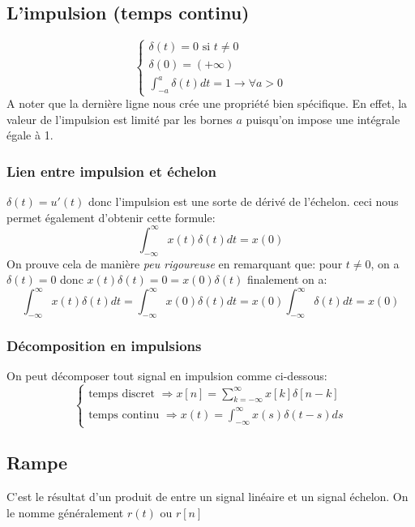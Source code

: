 \documentclass{report}
\begin{document}
\subsection{L'impulsion (temps continu)}
\begin{equation}
\begin{cases}
\delta (t) = 0 \text{ si } t \neq 0\\
\delta (0) = (+\infty)\\
\int_{-a}^a \delta (t) dt = 1 \rightarrow \forall a > 0
\end{cases}
\end{equation}
A noter que la dernière ligne nous crée une propriété bien spécifique. En effet, la valeur de l'impulsion est limité par les bornes $a$ puisqu'on impose une intégrale égale à 1.

\subsubsection{Lien entre impulsion et échelon}
$\delta (t) = u'(t)$ donc l'impulsion est une sorte de dérivé de l'échelon. ceci nous permet également d'obtenir cette formule:
\begin{equation}
\int_{-\infty}^{\infty} x(t) \delta(t)dt = x(0)
\end{equation}
On prouve cela de manière \textit{peu rigoureuse} en remarquant que: pour $t \neq 0$, on a $\delta(t) = 0$ donc $x(t)\delta(t) = 0 = x(0)\delta(t)$ finalement on a:
\begin{equation}
\int_{-\infty}^{\infty} x(t) \delta(t)dt = \int_{-\infty}^{\infty} x(0) \delta(t)dt = x(0) \int_{-\infty}^{\infty} \delta(t)dt = x(0)
\end{equation} 

\subsubsection{Décomposition en impulsions}
On peut décomposer tout signal en impulsion comme ci-dessous:
\begin{equation}
\begin{cases}
\text{temps discret } \Rightarrow x[n] = \sum_{k=-\infty}^{\infty}x[k]\delta[n-k] \\
\text{temps continu } \Rightarrow x(t) = \int_{-\infty}^{\infty} x(s) \delta(t-s)ds
\end{cases}
\end{equation}

\subsection{Rampe}
C'est le résultat d'un produit de entre un signal linéaire et un signal échelon. On le nomme généralement $r(t)$ ou $r[n]$
\end{document}
